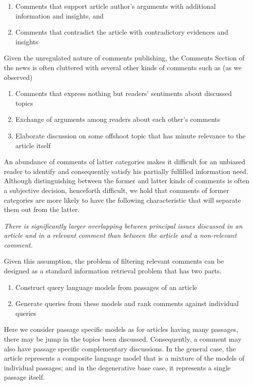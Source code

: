 \documentclass[article]{IEEEtran}
\newcounter{tmpc}
\begin{document}
\begin{enumerate}
\item Comments that support article author's arguments with additional information and insights, and
\item Comments that contradict the article with contradictory evidences and insights
\setcounter{tmpc}{\theenumi}
\end{enumerate}

Given the unregulated nature of comments publishing, the Comments Section of the news is often cluttered with several other kinds of comments such as (as we observed)

\begin{enumerate}
\setcounter{enumi}{\thetmpc}
\item Comments that express nothing but readers' sentiments about discussed topics
\item Exchange of arguments among readers about each other's comments
\item Elaborate discussion on some offshoot topic that has minute relevance to the article itself
\end{enumerate} 

An abundance of comments of latter categories makes it difficult for an unbiased reader to identify and consequently satisfy his partially fulfilled information need. Although distinguishing between the former and latter kinds of comments is often a subjective decision, henceforth difficult, we hold that comments of former categories are more likely to have the following characteristic that will separate them out from the latter.
\bigskip

\textit{There is significantly larger overlapping between principal issues discussed in an article and in a relevant comment than between the article and a non-relevant comment.}    
\bigskip

Given this assumption, the problem of filtering relevant comments can be designed as a standard information retrieval problem that has two parts.

\begin{enumerate}
\item Construct query language models from passages of an article 
\item Generate queries from these models and rank comments against individual queries
\end{enumerate}

Here we consider passage specific models as for articles having many passages, there may be jump in the topics been discussed. Consequently, a comment may also have passage specific complementary discussions. In the general case, the article represents a composite language model that is a mixture of the models of individual passages; and in the degenerative base case, it represents a single passage itself.  
\end{document}
